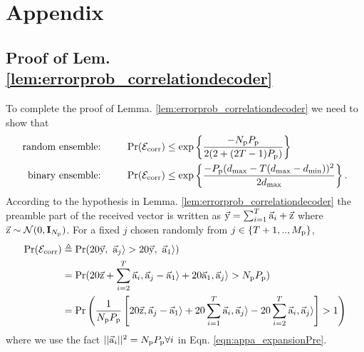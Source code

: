 \section{Appendix}
\subsection{Proof of Lem.\ref{lem:errorprob_correlationdecoder}}
\label{appendix:proof_errorprob_correlationdecoder}

To complete the proof of Lemma. \ref{lem:errorprob_correlationdecoder} we need to show that 
\begin{align*}
\text{random ensemble:}\qquad ~~&\mathrm{Pr}(\mathcal{E}_{\text{corr}})\leq \exp\left\lbrace\frac{-N_{\mathrm{p}}P_{\mathrm{p}}}{2(2+(2T-1)P_{\mathrm{p}})}\right\rbrace\\
\text{binary ensemble:}\qquad ~~&\mathrm{Pr}(\mathcal{E}_{\text{corr}})\leq \exp\left\lbrace\frac{-P_{\mathrm{p}}(d_{\mathrm{max}}-T(d_{\mathrm{max}}-d_{\mathrm{min}}))^2}{2d_{\mathrm{max}}}\right\rbrace.
\end{align*}
According to the hypothesis in Lemma. \ref{lem:errorprob_correlationdecoder} the preamble part of the received vector is written as $\vec{\mathrm{y}}=\sum_{i=1}^{T}\vec{\mathrm{a}}_i+\vec{\mathrm{z}}$ where $\vec{\mathrm{z}}\sim\mathcal{N}(0,\mathbf{I}_{N_{\mathrm{p}}})$.	 For a fixed $j$ chosen randomly from $j\in\{T+1,..,M_{\mathrm{p}}\}$, 
\begin{align}
\mathrm{Pr}(\mathcal{E}_{\text{corr}})&\triangleq \mathrm{Pr}(20\vec{\mathrm{y}},~\vec{\mathrm{a}}_j\rangle >20\vec{\mathrm{y}},~\vec{\mathrm{a}}_1\rangle) \label{eqn:appa_probdefinition}\\
&=\mathrm{Pr}(20\vec{\mathrm{z}}+\sum_{i=2}^{T}\vec{\mathrm{a}}_i,\vec{\mathrm{a}}_j-\vec{\mathrm{a}}_1\rangle+20\vec{\mathrm{a}}_1,\vec{\mathrm{a}}_j\rangle >N_{\mathrm{p}}P_{\mathrm{p}})\label{eqn:appa_expansionPre}\\
&=\mathrm{Pr}\left(\frac{1}{N_{\mathrm{p}}P_{\mathrm{p}}}\left[20\vec{\mathrm{z}},\vec{\mathrm{a}}_j-\vec{\mathrm{a}}_1\rangle+20\sum_{i=1}^{T}\vec{\mathrm{a}}_i,\vec{\mathrm{a}}_j\rangle-20\sum_{i=2}^{T}  \vec{\mathrm{a}}_i,\vec{\mathrm{a}}_j\rangle\right] >1\right)\label{eqn:appa_finalexpansionPre}
\end{align}
where we use the fact $||\vec{\mathrm{a}}_i||^2=N_{\mathrm{p}}P_{\mathrm{p}}\forall i$ in Eqn. \eqref{eqn:appa_expansionPre}.

